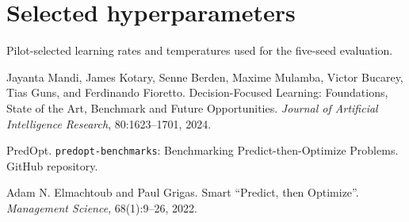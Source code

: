 \documentclass[11pt]{article}
\begin{document}
\appendix
\section{Selected hyperparameters}
\label{app:hyper}

\begin{table}[H]
\centering

\caption{Pilot-selected learning rates and temperatures used for the five-seed evaluation.}
\end{table}

\begin{thebibliography}{9}

Jayanta Mandi, James Kotary, Senne Berden, Maxime Mulamba, Victor Bucarey, Tias Guns, and Ferdinando Fioretto.
\newblock Decision-Focused Learning: Foundations, State of the Art, Benchmark and Future Opportunities.
\newblock \emph{Journal of Artificial Intelligence Research}, 80:1623--1701, 2024.

PredOpt.
\newblock \texttt{predopt-benchmarks}: Benchmarking Predict-then-Optimize Problems.
\newblock GitHub repository.

Adam N. Elmachtoub and Paul Grigas.
\newblock Smart ``Predict, then Optimize''.
\newblock \emph{Management Science}, 68(1):9--26, 2022.

\end{thebibliography}
\end{document}
